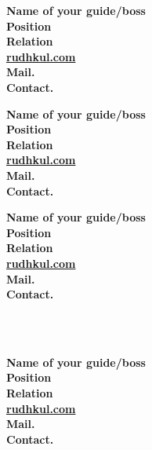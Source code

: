 \documentclass[11pt]{anirudhcv}
\begin{document}
\begin{minipage}[t]{0.35\textwidth}
	\vspace{-\baselineskip} %
	\textbf{Name of your guide/boss}\\
	\textbf{Position}\\
	\textbf{Relation}\\
	\textbf{\faGlobe\xspace \href{http://rudhkul.com}{rudhkul.com\hspace{0.5em} {\color{NextBlue}{\faMousePointer}}}}\\
	\textbf{\faEnvelope\xspace Mail.}\\
	\textbf{\faMobile\xspace Contact.}
\end{minipage}
\begin{minipage}[t]{0.35\textwidth}
	\vspace{-\baselineskip} %
	\textbf{Name of your guide/boss}\\
	\textbf{Position}\\
	\textbf{Relation}\\
	\textbf{\faGlobe\xspace \href{http://rudhkul.com}{rudhkul.com\hspace{0.5em} {\color{NextBlue}{\faMousePointer}}}}\\
	\textbf{\faEnvelope\xspace Mail.}\\
	\textbf{\faMobile\xspace Contact.}
\end{minipage}
\begin{minipage}[t]{0.35\textwidth}
	\vspace{-\baselineskip} %
	\textbf{Name of your guide/boss}\\
	\textbf{Position}\\
	\textbf{Relation}\\
	\textbf{\faGlobe\xspace \href{http://rudhkul.com}{rudhkul.com\hspace{0.5em} {\color{NextBlue}{\faMousePointer}}}}\\
	\textbf{\faEnvelope\xspace Mail.}\\
	\textbf{\faMobile\xspace Contact.}
\end{minipage}\\\\


\begin{minipage}[t]{0.35\textwidth}
	\vspace{-\baselineskip} %
	\textbf{Name of your guide/boss}\\
	\textbf{Position}\\
	\textbf{Relation}\\
	\textbf{\faGlobe\xspace \href{http://rudhkul.com}{rudhkul.com\hspace{0.5em} {\color{NextBlue}{\faMousePointer}}}}\\
	\textbf{\faEnvelope\xspace Mail.}\\
	\textbf{\faMobile\xspace Contact.}
\end{minipage}\\\\
\end{document}
